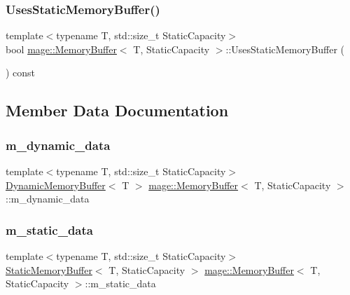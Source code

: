 \subsubsection{\texorpdfstring{Uses\+Static\+Memory\+Buffer()}{UsesStaticMemoryBuffer()}}
{\footnotesize\ttfamily template$<$typename T, std\+::size\+\_\+t Static\+Capacity$>$ \\
bool \mbox{\hyperlink{classmage_1_1_memory_buffer}{mage\+::\+Memory\+Buffer}}$<$ T, Static\+Capacity $>$\+::Uses\+Static\+Memory\+Buffer (\begin{DoxyParamCaption}{ }\end{DoxyParamCaption}) const\hspace{0.3cm}{\ttfamily [noexcept]}}



\subsection{Member Data Documentation}
\mbox{\label{classmage_1_1_memory_buffer_af4b252551b0e89ab286dcc07efc69ec8}} 
\subsubsection{\texorpdfstring{m\+\_\+dynamic\+\_\+data}{m\_dynamic\_data}}
{\footnotesize\ttfamily template$<$typename T, std\+::size\+\_\+t Static\+Capacity$>$ \\
\mbox{\hyperlink{classmage_1_1_dynamic_memory_buffer}{Dynamic\+Memory\+Buffer}}$<$ T $>$ \mbox{\hyperlink{classmage_1_1_memory_buffer}{mage\+::\+Memory\+Buffer}}$<$ T, Static\+Capacity $>$\+::m\+\_\+dynamic\+\_\+data\hspace{0.3cm}{\ttfamily [private]}}

\mbox{\label{classmage_1_1_memory_buffer_a34c3523ef28317cf3b5b01c06bc25ae5}} 
\subsubsection{\texorpdfstring{m\+\_\+static\+\_\+data}{m\_static\_data}}
{\footnotesize\ttfamily template$<$typename T, std\+::size\+\_\+t Static\+Capacity$>$ \\
\mbox{\hyperlink{classmage_1_1_static_memory_buffer}{Static\+Memory\+Buffer}}$<$ T, Static\+Capacity $>$ \mbox{\hyperlink{classmage_1_1_memory_buffer}{mage\+::\+Memory\+Buffer}}$<$ T, Static\+Capacity $>$\+::m\+\_\+static\+\_\+data\hspace{0.3cm}{\ttfamily [private]}}

